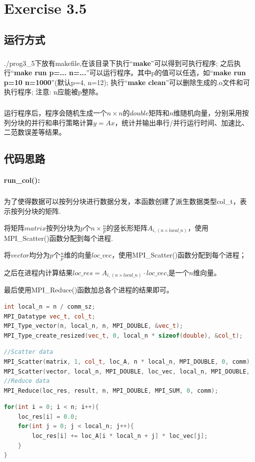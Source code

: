 \documentclass[UTF8, onecolumn, a4paper]{article}
\begin{document}
\section{Exercise 3.5}
\subsection{运行方式}
\subparagraph*{}
./prog3\_5下放有makefile,在该目录下执行“\textbf{make}”可以得到可执行程序; 之后执行“\textbf{make run p=... n=...}”可以运行程序。其中p的值可以任选，如“\textbf{make run p=10 n=1000}”(默认p=4, n=12); 执行“\textbf{make clean}”可以删除生成的.o文件和可执行程序; 注意: n应能被p整除。
\subparagraph*{}
运行程序后，程序会随机生成一个$n\times n$的$double$矩阵和$n$维随机向量，分别采用按列分块的并行和串行策略计算$y = Ax$，统计并输出串行/并行运行时间、加速比、二范数误差等结果。
\subsection{代码思路}
\paragraph*{run\_col():}
\subparagraph*{}
为了使得数据可以按列分块进行数据分发，本函数创建了派生数据类型col\_t，表示按列分块的矩阵.
\par 将矩阵$matrix$按列分块为$p$个$n \times \frac{n}{p}$的竖长形矩阵$A_{i,(n\times local\_n)}$，使用MPI\_Scatter()函数分配到每个进程.
\par 将$vector$均分为$p$个$\frac{n}{p}$维的向量$loc\_vec$，使用MPI\_Scatter()函数分配到每个进程；
\par 之后在进程内计算结果$loc\_res = A_{i,(n\times local\_n)}\cdot loc\_vec$,是一个$n$维向量。
\par 最后使用MPI\_Reduce()函数加总各个进程的结果即可。
\begin{lstlisting}[language={c++}, title={创建派生数据类型}]
int local_n = n / comm_sz;
MPI_Datatype vec_t, col_t;
MPI_Type_vector(n, local_n, n, MPI_DOUBLE, &vec_t);
MPI_Type_create_resized(vec_t, 0, local_n * sizeof(double), &col_t);
\end{lstlisting}
\begin{lstlisting}[language={c++}, title={数据分发与收集}]
//Scatter data
MPI_Scatter(matrix, 1, col_t, loc_A, n * local_n, MPI_DOUBLE, 0, comm);
MPI_Scatter(vector, local_n, MPI_DOUBLE, loc_vec, local_n, MPI_DOUBLE, 0, comm);
//Reduce data
MPI_Reduce(loc_res, result, n, MPI_DOUBLE, MPI_SUM, 0, comm);
\end{lstlisting}
\begin{lstlisting}[language={c++}, title={计算}]
for(int i = 0; i < n; i++){
	loc_res[i] = 0.0;
	for(int j = 0; j < local_n; j++){
		loc_res[i] += loc_A[i * local_n + j] * loc_vec[j];
	}
}
\end{lstlisting}
\end{document}
